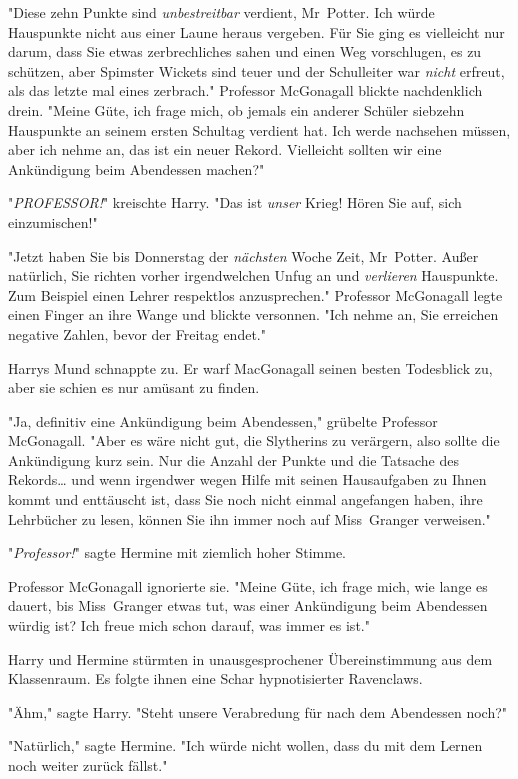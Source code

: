 {"Diese zehn Punkte sind \emph{unbestreitbar} verdient, Mr~Potter. Ich würde Hauspunkte nicht aus einer Laune heraus vergeben. Für Sie ging es vielleicht nur darum, dass Sie etwas zerbrechliches sahen und einen Weg vorschlugen, es zu schützen, aber Spimster Wickets sind teuer und der Schulleiter war \emph{nicht} erfreut, als das letzte mal eines zerbrach." Professor McGonagall blickte nachdenklich drein. "Meine Güte, ich frage mich, ob jemals ein anderer Schüler siebzehn Hauspunkte an seinem ersten Schultag verdient hat. Ich werde nachsehen müssen, aber ich nehme an, das ist ein neuer Rekord. Vielleicht sollten wir eine Ankündigung beim Abendessen machen?"

"\emph{PROFESSOR!}" kreischte Harry. "Das ist \emph{unser} Krieg! Hören Sie auf, sich einzumischen!"

"Jetzt haben Sie bis Donnerstag der \emph{nächsten} Woche Zeit, Mr~Potter. Außer natürlich, Sie richten vorher irgendwelchen Unfug an und \emph{verlieren} Hauspunkte. Zum Beispiel einen Lehrer respektlos anzusprechen." Professor McGonagall legte einen Finger an ihre Wange und blickte versonnen. "Ich nehme an, Sie erreichen negative Zahlen, bevor der Freitag endet."

Harrys Mund schnappte zu. Er warf MacGonagall seinen besten Todesblick zu, aber sie schien es nur amüsant zu finden.

"Ja, definitiv eine Ankündigung beim Abendessen," grübelte Professor McGonagall. "Aber es wäre nicht gut, die Slytherins zu verärgern, also sollte die Ankündigung kurz sein. Nur die Anzahl der Punkte und die Tatsache des Rekords… und wenn irgendwer wegen Hilfe mit seinen Hausaufgaben zu Ihnen kommt und enttäuscht ist, dass Sie noch nicht einmal angefangen haben, ihre Lehrbücher zu lesen, können Sie ihn immer noch auf Miss~Granger verweisen."

"\emph{Professor!}" sagte Hermine mit ziemlich hoher Stimme.

Professor McGonagall ignorierte sie. "Meine Güte, ich frage mich, wie lange es dauert, bis Miss~Granger etwas tut, was einer Ankündigung beim Abendessen würdig ist? Ich freue mich schon darauf, was immer es ist."

Harry und Hermine stürmten in unausgesprochener Übereinstimmung aus dem Klassenraum. Es folgte ihnen eine Schar hypnotisierter Ravenclaws.

"Ähm," sagte Harry. "Steht unsere Verabredung für nach dem Abendessen noch?"

"Natürlich," sagte Hermine. "Ich würde nicht wollen, dass du mit dem Lernen noch weiter zurück fällst."

}
